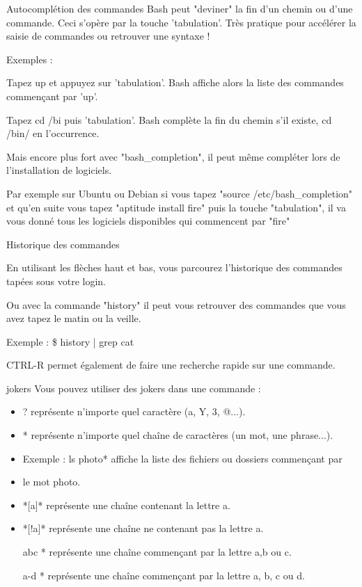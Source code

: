 \documentclass[10pt]{beamer}
\begin{document}
\begin{frame}{Autocomplétion des commandes}
	Bash peut "deviner" la fin d'un chemin ou d'une commande. Ceci s'opère par la touche 'tabulation'. Très pratique pour accélérer la saisie de commandes ou retrouver une syntaxe ! 
	
	Exemples :

	Tapez up et appuyez sur 'tabulation'. Bash affiche alors la liste des commandes commençant par 'up'.

	Tapez cd /bi puis 'tabulation'. Bash complète la fin du chemin s'il existe, cd /bin/ en l'occurrence.

	Mais encore plus fort avec "bash\_completion", il peut même compléter lors de l'installation de logiciels.

	Par exemple sur Ubuntu ou Debian si vous tapez "source /etc/bash\_completion" et qu'en suite vous tapez "aptitude install fire" puis la touche "tabulation", il va vous donné tous les logiciels disponibles qui commencent par "fire"
\end{frame}


\begin{frame}{Historique des commandes}

En utilisant les flèches haut et bas, vous parcourez l'historique des commandes tapées sous votre login.

Ou avec la commande "history" il peut vous retrouver des commandes que vous
avez tapez le matin ou la veille.


Exemple : \$ \alert{history} | \alert{grep} cat

\alert{CTRL-R} permet également de faire une recherche rapide sur une commande.
\end{frame}

\begin{frame}{jokers}
Vous pouvez utiliser des jokers dans une commande :
\begin{itemize}
\item ? représente n'importe quel caractère (a, Y, 3, @...).
\item * représente n'importe quel chaîne de caractères (un mot, une phrase...).
\item Exemple : ls photo* affiche la liste des fichiers ou dossiers commençant par
\item le mot photo.
\item *[a]* représente une chaîne contenant la lettre a.
\item *[!a]* représente une chaîne ne contenant pas la lettre a.
\item [abc]* représente une chaîne commençant par la lettre a,b ou c.
\item [a-d]* représente une chaîne commençant par la lettre a, b, c ou d.
\end{itemize}
\end{frame}
\end{document}
